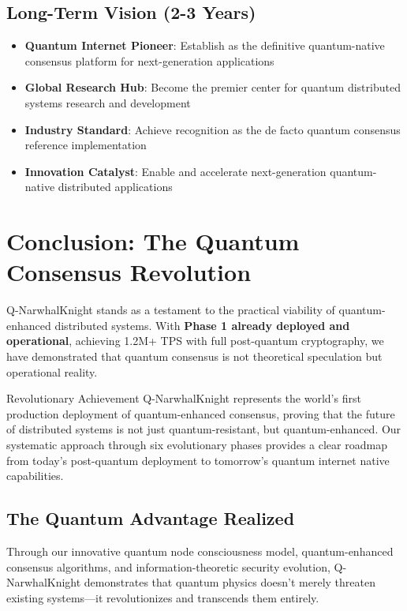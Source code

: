 \documentclass[11pt,a4paper]{article}
\begin{document}
\subsection{Long-Term Vision (2-3 Years)}

\begin{itemize}
\item \textbf{Quantum Internet Pioneer}: Establish as the definitive quantum-native consensus platform for next-generation applications
\item \textbf{Global Research Hub}: Become the premier center for quantum distributed systems research and development
\item \textbf{Industry Standard}: Achieve recognition as the de facto quantum consensus reference implementation
\item \textbf{Innovation Catalyst}: Enable and accelerate next-generation quantum-native distributed applications
\end{itemize}

\section{Conclusion: The Quantum Consensus Revolution}

Q-NarwhalKnight stands as a testament to the practical viability of quantum-enhanced distributed systems. With \textbf{Phase 1 already deployed and operational}, achieving 1.2M+ TPS with full post-quantum cryptography, we have demonstrated that quantum consensus is not theoretical speculation but operational reality.

\begin{achievementbox}{Revolutionary Achievement}
Q-NarwhalKnight represents the world's first production deployment of quantum-enhanced consensus, proving that the future of distributed systems is not just quantum-resistant, but quantum-enhanced. Our systematic approach through six evolutionary phases provides a clear roadmap from today's post-quantum deployment to tomorrow's quantum internet native capabilities.
\end{achievementbox}

\subsection{The Quantum Advantage Realized}

Through our innovative quantum node consciousness model, quantum-enhanced consensus algorithms, and information-theoretic security evolution, Q-NarwhalKnight demonstrates that quantum physics doesn't merely threaten existing systems—it revolutionizes and transcends them entirely.
\end{document}
